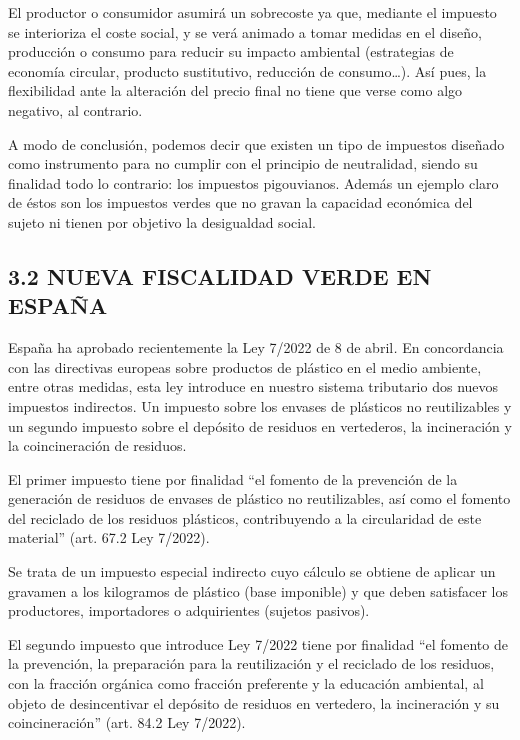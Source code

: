 \documentclass[
]{article}
\begin{document}
El productor o consumidor asumirá un sobrecoste ya que, mediante el
impuesto se interioriza el coste social, y se verá animado a tomar
medidas en el diseño, producción o consumo para reducir su impacto
ambiental (estrategias de economía circular, producto sustitutivo,
reducción de consumo\ldots). Así pues, la flexibilidad ante la
alteración del precio final no tiene que verse como algo negativo, al
contrario.

A modo de conclusión, podemos decir que existen un tipo de impuestos
diseñado como instrumento para no cumplir con el principio de
neutralidad, siendo su finalidad todo lo contrario: los impuestos
pigouvianos. Además un ejemplo claro de éstos son los impuestos verdes
que no gravan la capacidad económica del sujeto ni tienen por objetivo
la desigualdad social.

\hypertarget{nueva-fiscalidad-verde-en-espauxf1a}{%
\subsection*{3.2 NUEVA FISCALIDAD VERDE EN
ESPAÑA}\label{nueva-fiscalidad-verde-en-espauxf1a}}

España ha aprobado recientemente la Ley 7/2022 de 8 de abril\emph{.} En
concordancia con las directivas europeas sobre productos de plástico en
el medio ambiente, entre otras medidas, esta ley introduce en nuestro
sistema tributario dos nuevos impuestos indirectos. Un impuesto sobre
los envases de plásticos no reutilizables y un segundo impuesto sobre el
depósito de residuos en vertederos, la incineración y la coincineración
de residuos.

El primer impuesto tiene por finalidad ``el fomento de la prevención de
la generación de residuos de envases de plástico no reutilizables, así
como el fomento del reciclado de los residuos plásticos, contribuyendo a
la circularidad de este material'' (art. 67.2 Ley 7/2022).

Se trata de un impuesto especial indirecto cuyo cálculo se obtiene de
aplicar un gravamen a los kilogramos de plástico (base imponible) y que
deben satisfacer los productores, importadores o adquirientes (sujetos
pasivos).

El segundo impuesto que introduce Ley 7/2022 tiene por finalidad ``el
fomento de la prevención, la preparación para la reutilización y el
reciclado de los residuos, con la fracción orgánica como fracción
preferente y la educación ambiental, al objeto de desincentivar el
depósito de residuos en vertedero, la incineración y su coincineración''
(art. 84.2 Ley 7/2022).
\end{document}
